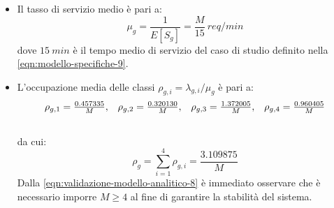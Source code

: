 \begin{itemize}
\item Il tasso di servizio medio è pari a:
\begin{equation}
\mu_g = \frac{1}{E[S_g]} = \frac{M}{15}\ req/min
\end{equation}
dove $15\ min$ è il tempo medio di servizio del caso di studio definito nella \ref{eqn:modello-specifiche-9}.

\item L'occupazione media delle classi $\rho_{g,i} = \lambda_{g,i}/\mu_g$ è pari a:
\begin{equation}
\begin{array}{l l l l}
\rho_{g,1} = \frac{0.457335}{M}, & \rho_{g,2} = \frac{0.320130}{M}, & \rho_{g,3} = \frac{1.372005}{M}, & \rho_{g,4} = \frac{0.960405}{M} \\[1.5em]
\end{array}
\end{equation}
da cui:
\begin{equation}
\label{eqn:validazione-modello-analitico-8}
\rho_g = \sum_{i=1}^4 \rho_{g,i} = \frac{3.109875}{M}
\end{equation}
Dalla \ref{eqn:validazione-modello-analitico-8} è immediato osservare che è necessario imporre $M \geq 4$ al fine di garantire la stabilità del sistema.
\end{itemize}

